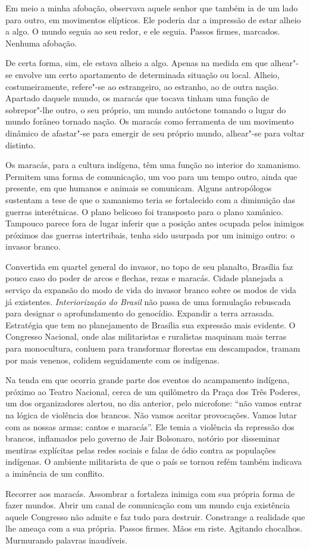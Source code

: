 Em meio a minha afobação, observava aquele
senhor que também ia de um lado para outro, em movimentos elípticos. Ele
poderia dar a impressão de estar alheio a algo. O mundo seguia ao seu
redor, e ele seguia. Passos firmes, marcados. Nenhuma afobação.

De certa forma, sim, ele estava alheio a algo. Apenas na medida em que
alhear"-se envolve um certo apartamento de determinada situação ou local.
Alheio, costumeiramente, refere"-se ao estrangeiro, ao estranho, ao de
outra nação. Apartado daquele mundo, os maracás que tocava tinham uma
função de sobrepor"-lhe outro, o seu próprio, um mundo autóctone tomando
o lugar do mundo forâneo tornado nação. Os maracás como ferramenta de um
movimento dinâmico de afastar"-se para emergir de seu próprio mundo,
alhear"-se para voltar distinto.

Os maracás, para a cultura indígena, têm uma função no interior do
xamanismo. Permitem uma forma de comunicação, um voo para um tempo
outro, ainda que presente, em que humanos e animais se comunicam. Alguns
antropólogos sustentam a tese de que o xamanismo teria se fortalecido
com a diminuição das guerras interétnicas. O plano belicoso foi
transposto para o plano xamânico. Tampouco parece fora de lugar inferir
que a posição antes ocupada pelos inimigos próximos das guerras
intertribais,
tenha sido usurpada por um inimigo outro: o invasor branco.

Convertida em quartel general do invasor, no topo de seu planalto,
Brasília faz pouco caso do poder de arcos e flechas, rezas e maracás.
Cidade planejada a serviço da expansão do modo de vida do invasor branco
sobre os modos de vida já existentes. \emph{Interiorização do
Brasil} não passa de uma formulação rebuscada para designar o
aprofundamento do genocídio. Expandir a terra arrasada. Estratégia que
tem no planejamento de Brasília sua expressão mais evidente. O Congresso
Nacional, onde alas militaristas e ruralistas maquinam mais terras para
monocultura, conluem para transformar florestas em descampados, tramam
por mais venenos, colidem seguidamente com os indígenas.

Na tenda em que ocorria grande parte dos eventos do acampamento
indígena, próximo ao Teatro Nacional, cerca de um quilômetro da Praça
dos Três Poderes, um dos organizadores alertou, no dia anterior, pelo
microfone: ``não vamos entrar na lógica de violência dos brancos. Não
vamos aceitar provocações. Vamos lutar com as nossas armas: cantos e
maracás''. Ele temia a violência da repressão dos brancos, inflamados
pelo governo de Jair Bolsonaro, notório por disseminar mentiras
explícitas pelas redes sociais e falas de ódio contra as populações
indígenas. O ambiente militarista de que o país se tornou refém também
indicava a iminência de um conflito.

Recorrer aos maracás. Assombrar a fortaleza inimiga com sua própria
forma de fazer mundos. Abrir um canal de comunicação com um mundo cuja
existência aquele Congresso não admite e faz tudo para destruir. Constrange a realidade que lhe ameaça
com a sua própria. Passos firmes. Mãos em riste. Agitando chocalhos.
Murmurando palavras inaudíveis.
